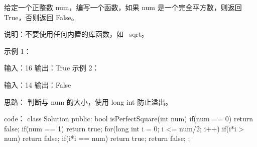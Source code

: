 给定一个正整数 num，编写一个函数，如果 num 是一个完全平方数，则返回 True，否则返回 False。

说明：不要使用任何内置的库函数，如  sqrt。

示例 1：

输入：16
输出：True
示例 2：

输入：14
输出：False

















思路：
判断与 num 的大小，使用 long int 防止溢出。






















code：
class Solution {
public:
    bool isPerfectSquare(int num) {
        if(num == 0) return false;
        if(num == 1) return true;
        for(long int i = 0; i <= num/2; i++)
        {
            if(i*i > num) return false;
            if(i*i == num) return true;
        }
        return false;
    }
};
